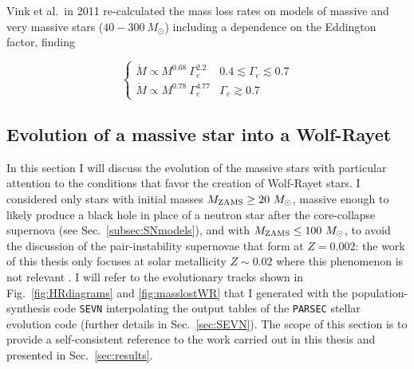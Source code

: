 \documentclass[a4paper,titlepage]{book}     	%
\newcommand{\sun}{\ensuremath{_\odot}}
\newcommand{\mzams}{M_\textup{ZAMS}}
\newcommand{\msun}{\ensuremath{M\sun}}
\begin{document}
Vink et al.\ in 2011 \cite{Vink2011} re-calculated the mass loss rates on models of massive and very massive stars ($40-300~\msun$) including a dependence on the Eddington factor, finding

\begin{equation}\label{eq:Vink2011}
\begin{cases}
\dot M \propto M^{0.68}\ \Gamma_e^{2.2} & 0.4 \lesssim \Gamma_e \lesssim 0.7 \\
\dot M \propto M^{0.78}\ \Gamma_e^{4.77} & \Gamma_e \gtrsim 0.7
\end{cases}
\end{equation}


\subsection{Evolution of a massive star into a Wolf-Rayet}\label{subsec:stellarevo}

In this section I will discuss the evolution of the massive stars with particular attention to the conditions that favor the creation of Wolf-Rayet stars. I considered only stars with initial masses $\mzams \geq 20~\msun$, massive enough to likely produce a black hole in place of a neutron star after the core-collapse supernova (see Sec.\ \ref{subsec:SNmodels}), and with $\mzams \leq 100~\msun$, to avoid the discussion of the pair-instability supernovae that form at $Z=0.002$: the work of this thesis only focuses at solar metallicity $Z\sim 0.02$ where this phenomenon is not relevant \cite{spera2017_pisnSNe}. I will refer to the evolutionary tracks shown in Fig.\ \ref{fig:HRdiagrams} and \ref{fig:masslostWR} that I generated with the population-synthesis code \texttt{SEVN} \cite{spera2019_mergingBBH} interpolating the output tables of the \texttt{PARSEC} stellar evolution code \cite{parsec2015_chen,MassGapStellarEvo_Costa2021} (further details in Sec.\ \ref{sec:SEVN}). The scope of this section is to provide a self-consistent reference to the work carried out in this thesis and presented in Sec.\ \ref{sec:results}. 
\end{document}
